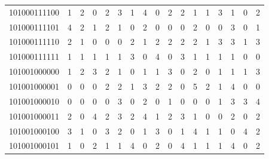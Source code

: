 \documentclass[10pt,a4paper]{article}
\begin{document}
\begin{longtable}{ |c|c|c|c|c|c|c|c|c|c|c|c|c|c|c|c|c| }
    101000111100              & 1                            & 2                                & 0                            & 2                              & 3   & 1   & 4   & 0   & 2   & 2   & 1   & 1   & 3   & 1   & 0   & 2   \\
    101000111101              & 4                            & 2                                & 1                            & 2                              & 1   & 0   & 2   & 0   & 0   & 0   & 2   & 0   & 0   & 3   & 0   & 1   \\
    101000111110              & 2                            & 1                                & 0                            & 0                              & 0   & 2   & 1   & 2   & 2   & 2   & 2   & 1   & 3   & 3   & 1   & 3   \\
    101000111111              & 1                            & 1                                & 1                            & 1                              & 1   & 3   & 0   & 4   & 0   & 3   & 1   & 1   & 1   & 1   & 0   & 0   \\
    101001000000              & 1                            & 2                                & 3                            & 2                              & 1   & 0   & 1   & 1   & 3   & 0   & 2   & 0   & 1   & 1   & 1   & 3   \\
    101001000001              & 0                            & 0                                & 0                            & 2                              & 2   & 1   & 3   & 2   & 2   & 0   & 5   & 2   & 1   & 4   & 0   & 0   \\
    101001000010              & 0                            & 0                                & 0                            & 0                              & 3   & 0   & 2   & 0   & 1   & 0   & 0   & 0   & 1   & 3   & 3   & 4   \\
    101001000011              & 2                            & 0                                & 4                            & 2                              & 3   & 2   & 4   & 1   & 2   & 3   & 1   & 0   & 0   & 2   & 0   & 2   \\
    101001000100              & 3                            & 1                                & 0                            & 3                              & 2   & 0   & 1   & 3   & 0   & 1   & 4   & 1   & 1   & 0   & 4   & 2   \\
    101001000101              & 1                            & 0                                & 2                            & 1                              & 1   & 4   & 0   & 2   & 0   & 4   & 1   & 1   & 1   & 4   & 0   & 2   \\

\end{longtable}
\end{document}
